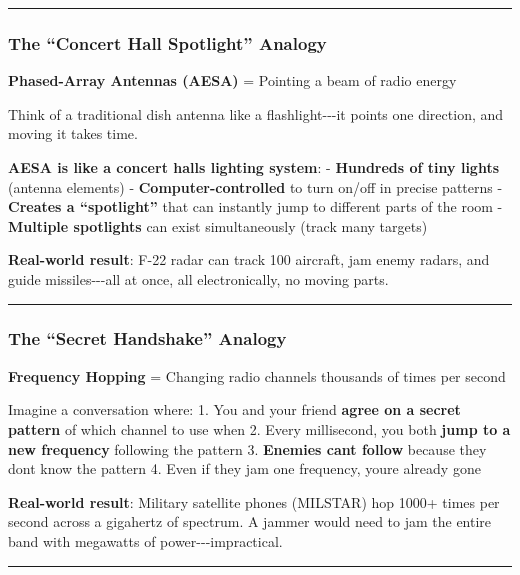 \begin{center}\rule{0.5\linewidth}{0.5pt}\end{center}

\subsubsection{The ``Concert Hall Spotlight''
Analogy}\label{the-concert-hall-spotlight-analogy}

\textbf{Phased-Array Antennas (AESA)} = Pointing a beam of radio energy

Think of a traditional dish antenna like a flashlight-\/-\/-it points
one direction, and moving it takes time.

\textbf{AESA is like a concert hall\textquotesingle s lighting system}:
- \textbf{Hundreds of tiny lights} (antenna elements) -
\textbf{Computer-controlled} to turn on/off in precise patterns -
\textbf{Creates a ``spotlight''} that can instantly jump to different
parts of the room - \textbf{Multiple spotlights} can exist
simultaneously (track many targets)

\textbf{Real-world result}: F-22 radar can track 100 aircraft, jam enemy
radars, and guide missiles-\/-\/-all at once, all electronically, no
moving parts.

\begin{center}\rule{0.5\linewidth}{0.5pt}\end{center}

\subsubsection{The ``Secret Handshake''
Analogy}\label{the-secret-handshake-analogy}

\textbf{Frequency Hopping} = Changing radio channels thousands of times
per second

Imagine a conversation where: 1. You and your friend \textbf{agree on a
secret pattern} of which channel to use when 2. Every millisecond, you
both \textbf{jump to a new frequency} following the pattern 3.
\textbf{Enemies can\textquotesingle t follow} because they
don\textquotesingle t know the pattern 4. Even if they jam one
frequency, you\textquotesingle re already gone

\textbf{Real-world result}: Military satellite phones (MILSTAR) hop
1000+ times per second across a gigahertz of spectrum. A jammer would
need to jam the entire band with megawatts of power-\/-\/-impractical.

\begin{center}\rule{0.5\linewidth}{0.5pt}\end{center}


